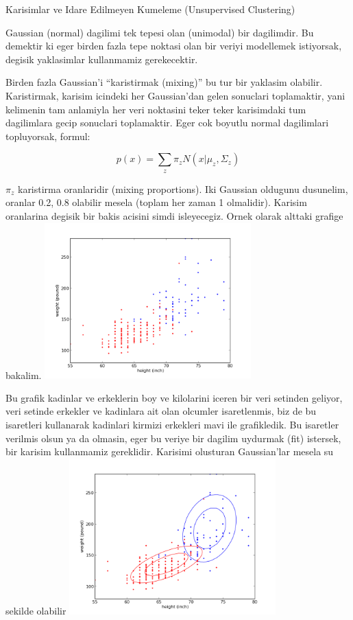 \documentclass[12pt,fleqn]{article}\usepackage{../common}
\begin{document}
Karisimlar ve Idare Edilmeyen Kumeleme (Unsupervised Clustering)

Gaussian (normal) dagilimi tek tepesi olan (unimodal) bir dagilimdir. Bu
demektir ki eger birden fazla tepe noktasi olan bir veriyi modellemek
istiyorsak, degisik yaklasimlar kullanmamiz gerekecektir. 

Birden fazla Gaussian'i ``karistirmak (mixing)'' bu tur bir yaklasim
olabilir. Karistirmak, karisim icindeki her Gaussian'dan gelen sonuclari
toplamaktir, yani kelimenin tam anlamiyla her veri noktasini teker teker
karisimdaki tum dagilimlara gecip sonuclari toplamaktir. Eger cok boyutlu
normal dagilimlari topluyorsak, formul:

\[ p(x) = \sum_z \pi_z N(x | \mu_z,\Sigma_z) \]

$\pi_z$ karistirma oranlaridir (mixing proportions). Iki Gaussian oldugunu
dusunelim, oranlar 0.2, 0.8 olabilir mesela (toplam her zaman 1
olmalidir). Karisim oranlarina degisik bir bakis acisini simdi
isleyecegiz. Ornek olarak alttaki grafige bakalim.
\includegraphics[height=6cm]{plotbio.png}

Bu grafik kadinlar ve erkeklerin boy ve kilolarini iceren bir veri setinden
geliyor, veri setinde erkekler ve kadinlara ait olan olcumler isaretlenmis,
biz de bu isaretleri kullanarak kadinlari kirmizi erkekleri mavi ile
grafikledik. Bu isaretler verilmis olsun ya da olmasin, eger bu veriye bir
dagilim uydurmak (fit) istersek, bir karisim kullanmamiz
gereklidir. Karisimi olusturan Gaussian'lar mesela su sekilde olabilir
\includegraphics[height=6cm]{plotbio_cluster.png}
\end{document}
